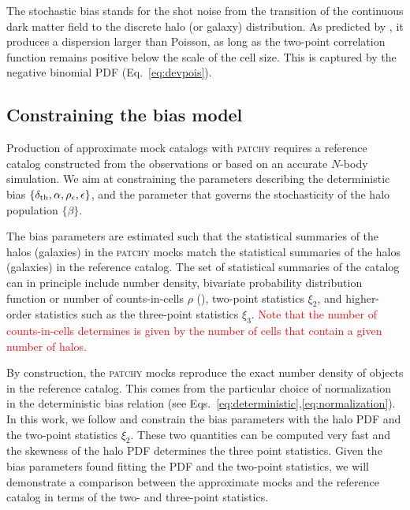 \documentclass[english,usenatbib]{mn2e}
\newcommand{\tod}[1]{{\textcolor{red}{ #1}}}
\begin{document}
The stochastic bias stands for the shot noise from the transition of the continuous dark matter field to the discrete halo (or galaxy) distribution. As predicted by \citet{Peebles1980}, it produces a dispersion larger than Poisson, as long as the two-point correlation function remains positive below the scale of the cell size. This is captured by the negative binomial PDF (Eq.~\ref{eq:devpois}).

\subsection{Constraining the bias model}
\label{sec:mcmc}

Production of approximate mock catalogs with \textsc{patchy} requires a reference catalog constructed from the observations or based on an accurate $N$-body simulation. 
We aim at constraining the parameters describing the deterministic bias $\{\delta_{\rm th},\alpha, \rho_{\epsilon},\epsilon\}$, and the parameter that governs the stochasticity of the halo population $\{\beta\}$.

The bias parameters are estimated such that the statistical summaries of the halos (galaxies) in the \textsc{patchy} mocks match the statistical summaries of the halos (galaxies) in the reference catalog. The set of statistical summaries of the catalog can in principle include number density, bivariate probability distribution function or number of counts-in-cells $\rho$ (), two-point statistics $\xi_{2}$, and higher-order statistics such as the three-point statistics $\xi_{3}$. \tod{Note that the number of counts-in-cells determines is given by the number of cells that contain a given number of halos.} 

By construction, the \textsc{patchy} mocks reproduce the exact number density of objects in the reference catalog. This comes from the particular choice of normalization in the deterministic bias relation (see Eqs.~\ref{eq:deterministic},\ref{eq:normalization}). In this work, we follow \citet{kitaura2015} and constrain the bias parameters with the halo PDF and the two-point statistics $\xi_{2}$. These two quantities can be computed very fast and the skewness of the halo PDF determines the three point statistics. Given the bias parameters found fitting the PDF and the two-point statistics, we will demonstrate a comparison between the approximate mocks and the reference catalog in terms of the two- and three-point statistics. 
\end{document}
